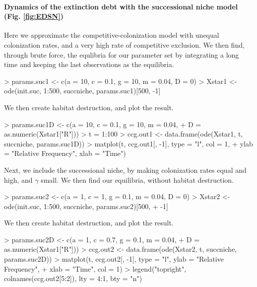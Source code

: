 \begin{boxedminipage}{\linewidth}
{\paragraph{Dynamics of the extinction debt with the successional niche model (Fig. \ref{fig:EDSN})}
Here we approximate the competitive-colonization model with unequal colonization rates, and a very high rate of competitive exclusion. We then find, through brute force, the equlibria for our parameter set by integrating a long time and keeping the last observations as the equilibria.
\begin{Schunk}
\begin{Sinput}
> params.suc1 <- c(a = 10, c = 0.1, g = 10, m = 0.04, D = 0)
> Xstar1 <- ode(init.suc, 1:500, succniche, params.suc1)[500, -1]
\end{Sinput}
\end{Schunk}
We then create habitat destruction, and plot the result.
\begin{Schunk}
\begin{Sinput}
> params.suc1D <- c(a = 10, c = 0.1, g = 10, m = 0.04, 
+      D = as.numeric(Xstar1["R"]))
> t = 1:100
> ccg.out1 <- data.frame(ode(Xstar1, t, succniche, params.suc1D))
> matplot(t, ccg.out1[, -1], type = "l", col = 1, 
+     ylab = "Relative Frequency", xlab = "Time")
\end{Sinput}
\end{Schunk}
Next, we include the successional niche, by making colonization rates equal and high, and $\gamma$ small. We then find our equilibria, without habitat destruction.
\begin{Schunk}
\begin{Sinput}
> params.suc2 <- c(a = 1, c = 1, g = 0.1, m = 0.04, D = 0)
> Xstar2 <- ode(init.suc, 1:500, succniche, params.suc2)[500, 
+     -1]
\end{Sinput}
\end{Schunk}
We then create habitat destruction, and plot the result.
\begin{Schunk}
\begin{Sinput}
> params.suc2D <- c(a = 1, c = 0.7, g = 0.1, m = 0.04, 
+       D = as.numeric(Xstar1["R"]))
> ccg.out2 <- data.frame(ode(Xstar2, t, succniche, params.suc2D))
> matplot(t, ccg.out2[, -1], type = "l", ylab = "Relative Frequency", 
+     xlab = "Time", col = 1)
> legend("topright", colnames(ccg.out2[5:2]), lty = 4:1, bty = "n")
\end{Sinput}
\end{Schunk}
}
\end{boxedminipage} \medskip

